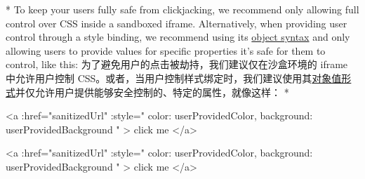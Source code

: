 \begin{paracol}{2}
\switchcolumn[0]*%
To keep your users fully safe from clickjacking, we recommend only
allowing full control over CSS inside a sandboxed iframe. Alternatively,
when providing user control through a style binding, we recommend using
its
\href{https://vuejs.org/guide/essentials/class-and-style.html\#binding-to-objects-1}{object
syntax} and only allowing users to provide values for specific
properties it's safe for them to control, like this:
\switchcolumn
为了避免用户的点击被劫持，我们建议仅在沙盒环境的 iframe 中允许用户控制
CSS。或者，当用户控制样式绑定时，我们建议使用其\href{https://cn.vuejs.org/guide/essentials/class-and-style.html\#object-syntax-2}{对象值形式}并仅允许用户提供能够安全控制的、特定的属性，就像这样：
\switchcolumn[0]*%
\begin{codeHtml}
<a
  :href="sanitizedUrl"
  :style="{
    color: userProvidedColor,
    background: userProvidedBackground
  }"
>
  click me
</a>
\end{codeHtml}
\switchcolumn
\begin{codeHtml}
<a
  :href="sanitizedUrl"
  :style="{
    color: userProvidedColor,
    background: userProvidedBackground
  }"
>
  click me
</a>
\end{codeHtml}
\end{paracol}



